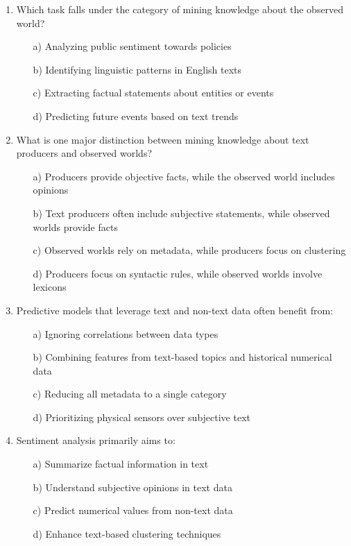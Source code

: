 \documentclass[8pt]{extarticle}
\begin{document}
\begin{multicols}{2}
\begin{enumerate}
\item Which task falls under the category of mining knowledge about the observed world?
\begin{itemize}
\item[a)] Analyzing public sentiment towards policies
\item[b)] Identifying linguistic patterns in English texts
\item[c)] Extracting factual statements about entities or events
\item[d)] Predicting future events based on text trends
\end{itemize}

\item What is one major distinction between mining knowledge about text producers and observed worlds?
\begin{itemize}
\item[a)] Producers provide objective facts, while the observed world includes opinions
\item[b)] Text producers often include subjective statements, while observed worlds provide facts
\item[c)] Observed worlds rely on metadata, while producers focus on clustering
\item[d)] Producers focus on syntactic rules, while observed worlds involve lexicons
\end{itemize}

\item Predictive models that leverage text and non-text data often benefit from:
\begin{itemize}
\item[a)] Ignoring correlations between data types
\item[b)] Combining features from text-based topics and historical numerical data
\item[c)] Reducing all metadata to a single category
\item[d)] Prioritizing physical sensors over subjective text
\end{itemize}

\item Sentiment analysis primarily aims to:
\begin{itemize}
\item[a)] Summarize factual information in text
\item[b)] Understand subjective opinions in text data
\item[c)] Predict numerical values from non-text data
\item[d)] Enhance text-based clustering techniques
\end{itemize}


\end{enumerate}
\end{multicols}
\end{document}
